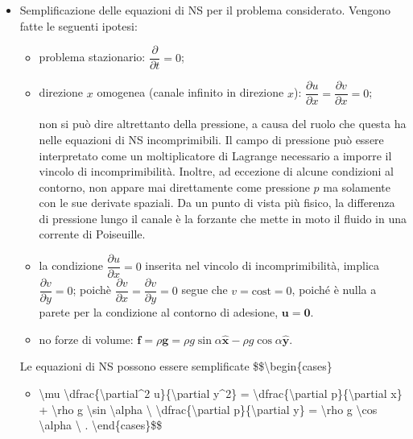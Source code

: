 \documentclass[letterpaper,10pt,italian]{jupyterBook}
\begin{document}
\begin{itemize}
\begin{itemize}
\end{itemize}

\item {} 
\sphinxAtStartPar
Semplificazione delle equazioni di NS per il problema considerato.
Vengono fatte le seguenti ipotesi:
\begin{itemize}
\item {} 
\sphinxAtStartPar
problema stazionario: \(\dfrac{\partial}{\partial t} = 0\);

\item {} 
\sphinxAtStartPar
direzione \(x\) omogenea (canale infinito in direzione \(x\)):
\(\dfrac{\partial u}{\partial x} = \dfrac{\partial v}{\partial x} = 0\);

\sphinxAtStartPar
non si può dire altrettanto della pressione, a causa del ruolo
che questa ha nelle equazioni di NS incomprimibili. Il campo di
pressione può essere interpretato come un moltiplicatore di
Lagrange necessario a imporre il vincolo di incomprimibilità.
Inoltre, ad eccezione di alcune condizioni al contorno, non
appare mai direttamente come pressione \(p\) ma solamente con le
sue derivate spaziali. Da un punto di vista più fisico, la
differenza di pressione lungo il canale è la forzante che mette
in moto il fluido in una corrente di Poiseuille.

\item {} 
\sphinxAtStartPar
la condizione \(\dfrac{\partial u}{\partial x} = 0\) inserita nel
vincolo di incomprimibilità, implica
\(\dfrac{\partial v}{\partial y}=0\); poichè
\(\dfrac{\partial v}{\partial x}=\dfrac{\partial v}{\partial y}=0\)
segue che \(v = \text{cost} = 0\), poiché è nulla a parete per la
condizione al contorno di adesione, \(\bm{u} = \bm{0}\).

\item {} 
\sphinxAtStartPar
no forze di volume:
\(\bm{f} = \rho \bm{g} = \rho g \sin \alpha \bm{\hat{x}} - \rho g \cos \alpha \bm{\hat{y}}\).

\end{itemize}

\sphinxAtStartPar
Le equazioni di NS possono essere semplificate \$\$\textbackslash{}begin\{cases\}
\begin{itemize}
\item {} 
\sphinxAtStartPar
\textbackslash{}mu \textbackslash{}dfrac\{\textbackslash{}partial\textasciicircum{}2 u\}\{\textbackslash{}partial y\textasciicircum{}2\} = \sphinxhyphen{} \textbackslash{}dfrac\{\textbackslash{}partial p\}\{\textbackslash{}partial x\} + \textbackslash{}rho g \textbackslash{}sin \textbackslash{}alpha \textbackslash{}
\textbackslash{}dfrac\{\textbackslash{}partial p\}\{\textbackslash{}partial y\} = \sphinxhyphen{} \textbackslash{}rho g \textbackslash{}cos \textbackslash{}alpha \textbackslash{} .
\textbackslash{}end\{cases\}\$\$


\end{itemize}
\end{itemize}
\end{document}

